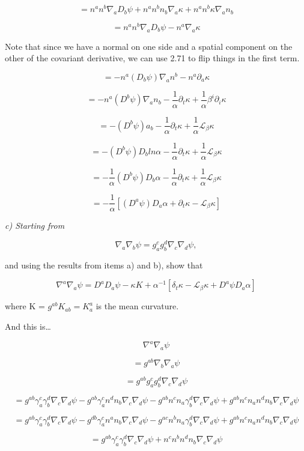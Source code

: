 \documentclass[landscape,letterpaper,10pt,english]{article}
\begin{document}
\[ = n^an^b\nabla_aD_b \psi + n^an^bn_b\nabla_a \kappa + n^an^b\kappa\nabla_an_b \]

\[ = n^an^b\nabla_aD_b \psi - n^a \nabla_a \kappa \]

Note that since we have a normal on one side and a spatial component on
the other of the covariant derivative, we can use 2.71 to flip things in
the first term.

\[ = - n^a(D_b\psi)\nabla_a n^b - n^a \partial_a \kappa \]

\[ = - n^a(D^b\psi)\nabla_a n_b  - \frac1\alpha \partial_t \kappa + \frac1\alpha \beta^i \partial_i \kappa  \]

\[ = - (D^b\psi)a_b - \frac1\alpha \partial_t \kappa + \frac1\alpha \mathcal{L}_\beta \kappa  \]

\[ = - (D^b\psi)D_b ln\alpha - \frac1\alpha \partial_t \kappa + \frac1\alpha \mathcal{L}_\beta \kappa  \]

\[ = - \frac1\alpha (D^b\psi)D_b \alpha - \frac1\alpha \partial_t \kappa + \frac1\alpha \mathcal{L}_\beta \kappa  \]

\[ = - \frac1\alpha [(D^a\psi)D_a \alpha + \partial_t \kappa - \mathcal{L}_\beta \kappa]  \]

    \emph{c) Starting from}

\[ \nabla_a \nabla_b \psi = g^c_a g^d_b \nabla_c \nabla_d \psi, \]

and using the results from items a) and b), show that

\[ \nabla^a \nabla_a \psi = D^a D_a \psi -\kappa K + \alpha^{-1} [\delta_t \kappa - \mathcal{L}_\beta \kappa + D^a \psi D_a \alpha] \]

where K = \(g^{ab}K_{ab} = K^a_a\) is the mean curvature.

    And this is\ldots{}

\[ \nabla^a \nabla_a \psi \]

\[ = g^{ab} \nabla_b \nabla_a \psi \]

\[ = g^{ab} g^c_a g^d_b \nabla_c \nabla_d \psi \]

\[ = g^{ab} \gamma^c_a \gamma^d_b \nabla_c \nabla_d \psi - g^{ab} \gamma^c_a n^d n_b \nabla_c \nabla_d \psi - g^{ab} n^c n_a \gamma^d_b \nabla_c \nabla_d \psi + g^{ab} n^cn_an^dn_b \nabla_c \nabla_d \psi \]

\[ = g^{ab} \gamma^c_a \gamma^d_b \nabla_c \nabla_d \psi - g^{db} \gamma^c_a n^a n_b \nabla_c \nabla_d \psi - g^{ac} n^b n_a \gamma^d_b \nabla_c \nabla_d \psi + g^{ab} n^cn_an^dn_b \nabla_c \nabla_d \psi \]

\[ = g^{ab} \gamma^c_a \gamma^d_b \nabla_c \nabla_d \psi + n^cn^bn^dn_b \nabla_c \nabla_d \psi \]
\end{document}
